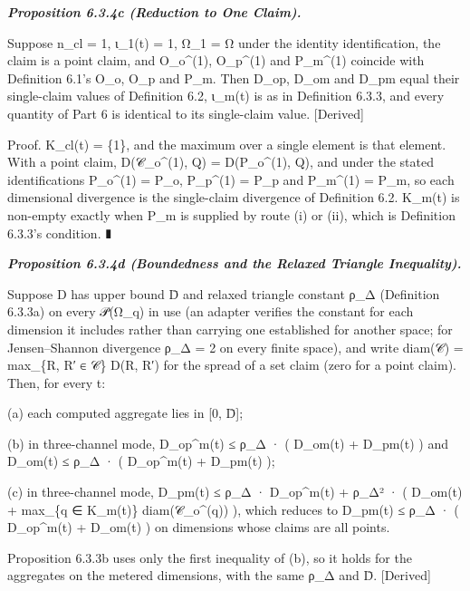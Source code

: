 \documentclass[
]{article}
\begin{document}
\emph{\textbf{Proposition 6.3.4c (Reduction to One Claim).}}

Suppose n\_cl = 1, ι\_1(t) = 1, Ω\_1 = Ω under the identity
identification, the claim is a point claim, and O\_o\^{}(1), O\_p\^{}(1)
and P\_m\^{}(1) coincide with Definition 6.1's O\_o, O\_p and P\_m. Then
D\_op, D\_om and D\_pm equal their single-claim values of Definition
6.2, ι\_m(t) is as in Definition 6.3.3, and every quantity of Part 6 is
identical to its single-claim value. {[}Derived{]}

Proof. K\_cl(t) = \{1\}, and the maximum over a single element is that
element. With a point claim, D(𝒞\_o\^{}(1), Q) = D(P\_o\^{}(1), Q), and
under the stated identifications P\_o\^{}(1) = P\_o, P\_p\^{}(1) = P\_p
and P\_m\^{}(1) = P\_m, so each dimensional divergence is the
single-claim divergence of Definition 6.2. K\_m(t) is non-empty exactly
when P\_m is supplied by route (i) or (ii), which is Definition 6.3.3's
condition. ∎

\emph{\textbf{Proposition 6.3.4d (Boundedness and the Relaxed Triangle
Inequality).}}

Suppose D has upper bound D̄ and relaxed triangle constant ρ\_Δ
(Definition 6.3.3a) on every 𝒫(Ω\_q) in use (an adapter verifies the
constant for each dimension it includes rather than carrying one
established for another space; for Jensen--Shannon divergence ρ\_Δ = 2
on every finite space), and write diam(𝒞) = max\_\{R, R′ ∈ 𝒞\} D(R, R′)
for the spread of a set claim (zero for a point claim). Then, for every
t:

(a) each computed aggregate lies in {[}0, D̄{]};

(b) in three-channel mode, D\_op\^{}m(t) ≤ ρ\_Δ · ( D\_om(t) + D\_pm(t)
) and D\_om(t) ≤ ρ\_Δ · ( D\_op\^{}m(t) + D\_pm(t) );

(c) in three-channel mode, D\_pm(t) ≤ ρ\_Δ · D\_op\^{}m(t) + ρ\_Δ² · (
D\_om(t) + max\_\{q ∈ K\_m(t)\} diam(𝒞\_o\^{}(q)) ), which reduces to
D\_pm(t) ≤ ρ\_Δ · ( D\_op\^{}m(t) + D\_om(t) ) on dimensions whose
claims are all points.

Proposition 6.3.3b uses only the first inequality of (b), so it holds
for the aggregates on the metered dimensions, with the same ρ\_Δ and D̄.
{[}Derived{]}
\end{document}

